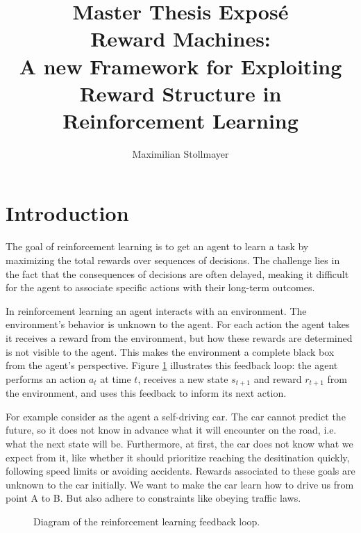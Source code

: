 \documentclass[12pt, a4paper]{article}
\title{{\Huge Master Thesis Exposé}\\Reward Machines:\\ A new Framework for Exploiting Reward Structure in Reinforcement Learning}
\author{Maximilian Stollmayer}
\date{}
\begin{document}
\maketitle

\section*{Introduction}

The goal of reinforcement learning is to get an agent to learn a task by maximizing the total rewards over sequences of decisions. The challenge lies in the fact that the consequences of decisions are often delayed, meaking it difficult for the agent to associate specific actions with their long-term outcomes.

In reinforcement learning an agent interacts with an environment. The environment's behavior is unknown to the agent. For each action the agent takes it receives a reward from the environment, but how these rewards are determined is not visible to the agent. This makes the environment a complete black box from the agent's perspective. Figure \ref{fig:rl_framework} illustrates this feedback loop: the agent performs an action $a_t$ at time $t$, receives a new state $s_{t+1}$ and reward $r_{t+1}$ from the environment, and uses this feedback to inform its next action.

For example consider as the agent a self-driving car. The car cannot predict the future, so it does not know in advance what it will encounter on the road, i.e. what the next state will be. Furthermore, at first, the car does not know what we expect from it, like whether it should prioritize reaching the desitination quickly, following speed limits or avoiding accidents. Rewards associated to these goals are unknown to the car initially. We want to make the car learn how to drive us from point A to B. But also adhere to constraints like obeying traffic laws.

\usetikzlibrary{graphs, quotes}
\begin{figure}[ht!]
	\centering
	\caption{Diagram of the reinforcement learning feedback loop.}
	\label{fig:rl_framework}
\end{figure}
\end{document}
